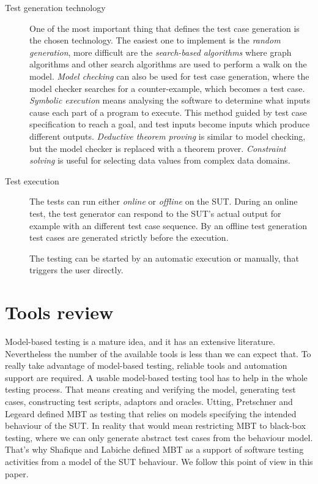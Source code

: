 \documentclass{article}
\begin{document}
\begin{description}
	\item[Test generation technology] One of the most important thing that defines the test case generation is the chosen technology. The easiest one to implement is the \textit{random generation}, more difficult are the \textit{search-based algorithms} where graph algorithms and other search algorithms are used to perform a walk on the model. \textit{Model checking} can also be used for test case generation, where the model checker searches for a counter-example, which becomes a test case. \textit{Symbolic execution} means analysing the software to determine what inputs cause each part of a program to execute. This method guided by test case specification to reach a goal, and test inputs become inputs which produce different outputs. \textit{Deductive theorem proving} is similar to model checking, but the model checker is replaced with a theorem prover. \textit{Constraint solving} is useful for selecting data values from complex data domains.
	
	\item[Test execution] The tests can run either \textit{online} or \textit{offline} on the SUT. During an online test, the test generator can respond to the SUT's actual output for example with an different test case sequence. By an offline test generation test cases are generated strictly before the execution.
	
	The testing can be started by an automatic execution or manually, that triggers the user directly.
\end{description}



\section{Tools review}
\label{sec:toolsreview}

Model-based testing is a mature idea, and it has an extensive literature. Nevertheless the number of the available tools is less than we can expect that. To really take advantage of model-based testing, reliable tools and automation support are required. A usable model-based testing tool has to help in the whole testing process. That means creating and verifying the model, generating test cases, constructing test scripts, adaptors and oracles. Utting, Pretschner and Legeard \cite{taxonomy} defined MBT as testing that relies on models specifying the intended behaviour of the SUT. In reality that would mean restricting MBT to black-box testing, where we can only generate abstract test cases from the behaviour model. That's why Shafique and Labiche defined MBT as a support of software testing activities from a model of the SUT behaviour. We follow this point of view in this paper.
\end{document}
